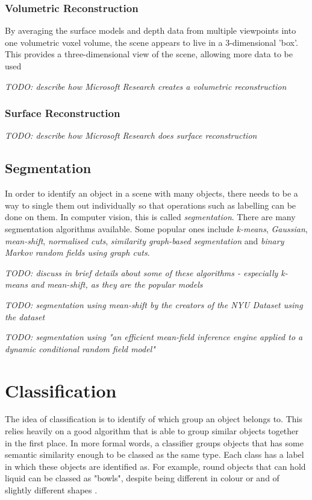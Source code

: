 \documentclass[lit_review.tex]{subfiles}
\begin{document}
\subsubsection{Volumetric Reconstruction}
By averaging the surface models and depth data from multiple viewpoints into one volumetric voxel volume, the scene appears to live in a 3-dimensional 'box'. This provides a three-dimensional view of the scene, allowing more data to be used 

\textit{TODO: describe how Microsoft Research \cite{ms-3d-paper} creates a volumetric reconstruction}

\subsubsection{Surface Reconstruction} 
\textit{TODO: describe how Microsoft Research \cite{ms-surface-paper} does surface reconstruction}

\subsection{Segmentation}
In order to identify an object in a scene with many objects, there needs to be a way to single them out individually so that operations such as labelling can be done on them. In computer vision, this is called \textit{segmentation}. There are many segmentation algorithms available. Some popular ones include \textit{k-means}, \textit{Gaussian}, \textit{mean-shift}, \textit{normalised cuts}, \textit{similarity graph-based segmentation} and \textit{binary Markov random fields using graph cuts}.

\textit{TODO: discuss in brief details about some of these algorithms - especially k-means and mean-shift, as they are the popular models}

\textit{TODO: segmentation using mean-shift by the creators of the NYU Dataset using the dataset \cite{nyu-dataset}}

\textit{TODO: segmentation using "an efficient mean-field inference engine applied to a dynamic conditional random field model" \cite{semantic-paint}}

\newpage

\section{Classification}
The idea of classification is to identify of which group an object belongs to. This relies heavily on a good algorithm that is able to group similar objects together in the first place. In more formal words, a classifier groups objects that has some semantic similarity enough to be classed as the same type. Each class has a label in which these objects are identified as. For example, round objects that can hold liquid can be classed as "bowls", despite being different in colour or and of slightly different shapes \cite{hall-notes}. 
\end{document}
